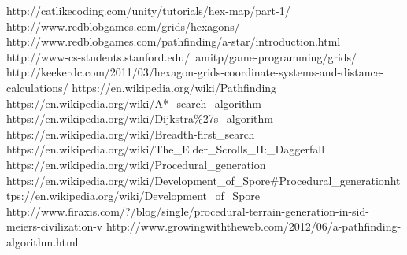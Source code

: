 \begin{thebibliography}{x}
 http://catlikecoding.com/unity/tutorials/hex-map/part-1/
 http://www.redblobgames.com/grids/hexagons/
 http://www.redblobgames.com/pathfinding/a-star/introduction.html
 http://www-cs-students.stanford.edu/~amitp/game-programming/grids/
 http://keekerdc.com/2011/03/hexagon-grids-coordinate-systems-and-distance-calculations/
 https://en.wikipedia.org/wiki/Pathfinding
 https://en.wikipedia.org/wiki/A*\_search\_algorithm
 https://en.wikipedia.org/wiki/Dijkstra\%27s\_algorithm
 https://en.wikipedia.org/wiki/Breadth-first\_search
 https://en.wikipedia.org/wiki/The\_Elder\_Scrolls\_II:\_Daggerfall
 https://en.wikipedia.org/wiki/Procedural\_generation
 https://en.wikipedia.org/wiki/Development\_of\_Spore\#Procedural\_generationhttps://en.wikipedia.org/wiki/Development\_of\_Spore
 http://www.firaxis.com/?/blog/single/procedural-terrain-generation-in-sid-meiers-civilization-v
 http://www.growingwiththeweb.com/2012/06/a-pathfinding-algorithm.html
\end{thebibliography}
